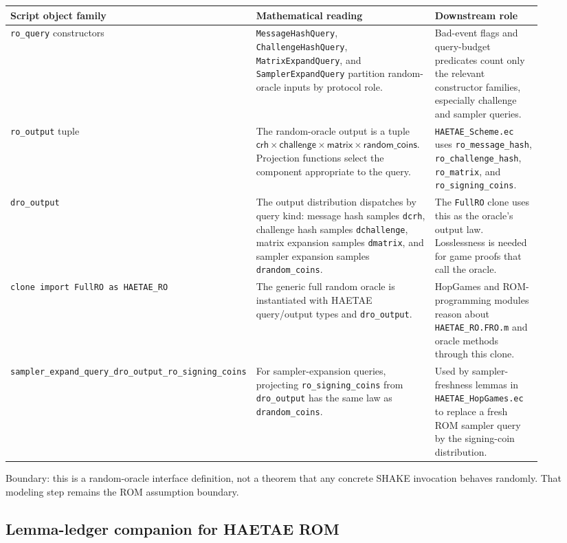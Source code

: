 \documentclass[11pt]{report}
\DeclareRobustCommand{\file}[1]{\ifmmode\text{\nolinkurl{#1}}\else\nolinkurl{#1}\fi}
\DeclareRobustCommand{\ec}[1]{\ifmmode\text{\nolinkurl{#1}}\else\nolinkurl{#1}\fi}
\theoremstyle{definition}
\theoremstyle{plain}
\begin{document}
\begin{longtable}{p{0.27\linewidth}p{0.38\linewidth}p{0.25\linewidth}}
\toprule
\textbf{Script object family} & \textbf{Mathematical reading} & \textbf{Downstream role} \\
\midrule
\ec{ro\_query} constructors &
\ec{MessageHashQuery}, \ec{ChallengeHashQuery}, \ec{MatrixExpandQuery}, and
\ec{SamplerExpandQuery} partition random-oracle inputs by protocol role. &
Bad-event flags and query-budget predicates count only the relevant
constructor families, especially challenge and sampler queries. \\
\midrule
\ec{ro\_output} tuple &
The random-oracle output is a tuple \(\mathsf{crh} \times
\mathsf{challenge} \times \mathsf{matrix} \times \mathsf{random\_coins}\).
Projection functions select the component appropriate to the query. &
\file{HAETAE\_Scheme.ec} uses \ec{ro\_message\_hash},
\ec{ro\_challenge\_hash}, \ec{ro\_matrix}, and \ec{ro\_signing\_coins}. \\
\midrule
\ec{dro\_output} &
The output distribution dispatches by query kind: message hash samples
\ec{dcrh}, challenge hash samples \ec{dchallenge}, matrix expansion samples
\ec{dmatrix}, and sampler expansion samples \ec{drandom\_coins}. &
The \ec{FullRO} clone uses this as the oracle's output law.  Losslessness is
needed for game proofs that call the oracle. \\
\midrule
\ec{clone import FullRO as HAETAE\_RO} &
The generic full random oracle is instantiated with HAETAE query/output types
and \ec{dro\_output}. &
HopGames and ROM-programming modules reason about \ec{HAETAE\_RO.FRO.m} and
oracle methods through this clone. \\
\midrule
\ec{sampler\_expand\_query\_dro\_output\_ro\_signing\_coins} &
For sampler-expansion queries, projecting \ec{ro\_signing\_coins} from
\ec{dro\_output} has the same law as \ec{drandom\_coins}. &
Used by sampler-freshness lemmas in \file{HAETAE\_HopGames.ec} to replace a
fresh ROM sampler query by the signing-coin distribution. \\
\bottomrule
\end{longtable}

Boundary: this is a random-oracle interface definition, not a theorem that any
concrete SHAKE invocation behaves randomly.  That modeling step remains the
ROM assumption boundary.

\subsection{Lemma-ledger companion for HAETAE ROM}
\end{document}
